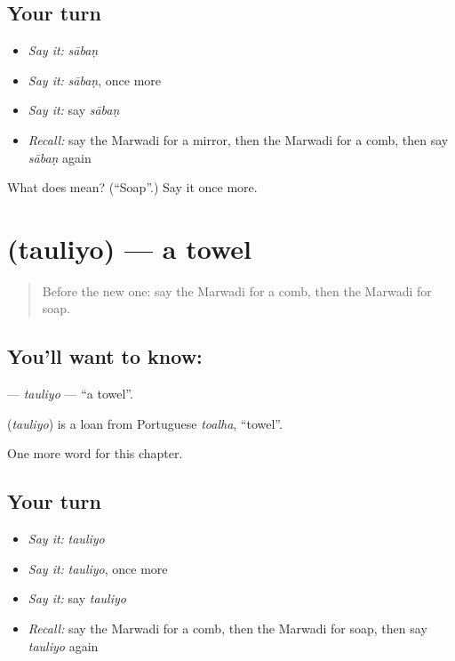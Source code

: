 \subsection*{Your turn}
\begin{itemize}
\raggedright
  \item \emph{Say it:} \emph{sābaṇ}
  \item \emph{Say it:} \emph{sābaṇ}, once more
  \item \emph{Say it:} say \emph{sābaṇ}
  \item \emph{Recall:} say the Marwadi for a mirror, then the Marwadi for a comb, then say \emph{sābaṇ} again
\end{itemize}

\begin{tcolorbox}[breakable,colback=teal!4,colframe=teal!35!black,title={Before you move on}]
What does  mean? (\textquotedblleft{}Soap\textquotedblright{}.) Say it once more.
\end{tcolorbox}
\section[\texorpdfstring{\mw{तौलियो} (tauliyo)}{तौलियो (tauliyo)}]{ (tauliyo) — a towel}

\label{lesson:MW-C124-tauliyo}



\begin{quote}
Before the new one: say the Marwadi for a comb, then the Marwadi for soap.
\end{quote}

\subsection*{You'll want to know: }
\textbf{} — \emph{tauliyo} — \textquotedblleft{}a towel\textquotedblright{}.

\begin{cousinweb}
\textbf{} (\emph{tauliyo}) is a loan from Portuguese \emph{toalha}, \textquotedblleft{}towel\textquotedblright{}.
\end{cousinweb}

\begin{grammarlens}[title={What you've built}]
One more word for this chapter.
\end{grammarlens}

\subsection*{Your turn}
\begin{itemize}
\raggedright
  \item \emph{Say it:} \emph{tauliyo}
  \item \emph{Say it:} \emph{tauliyo}, once more
  \item \emph{Say it:} say \emph{tauliyo}
  \item \emph{Recall:} say the Marwadi for a comb, then the Marwadi for soap, then say \emph{tauliyo} again
\end{itemize}

